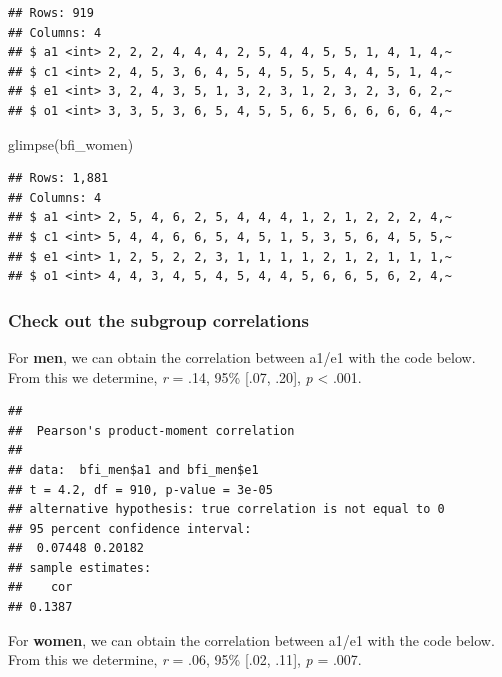 \documentclass[
]{krantz}
\makeatletter
\newenvironment{Shaded}{\begin{snugshade}}{\end{snugshade}}
\newcommand{\FunctionTok}[1]{\textcolor[rgb]{0,0,0}{#1}}
\newcommand{\NormalTok}[1]{#1}
\newcommand{\SpecialCharTok}[1]{\textcolor[rgb]{0,0,0}{#1}}
\newenvironment{kframe}{%
\medskip{}
\setlength{\fboxsep}{.8em}
 \def\at@end@of@kframe{}%
 \ifinner\ifhmode%
  \def\at@end@of@kframe{\end{minipage}}%
  \begin{minipage}{\columnwidth}%
 \fi\fi%
 \def\FrameCommand##1{\hskip\@totalleftmargin \hskip-\fboxsep
 \colorbox{shadecolor}{##1}\hskip-\fboxsep
     \hskip-\linewidth \hskip-\@totalleftmargin \hskip\columnwidth}%
 \MakeFramed {\advance\hsize-\width
   \@totalleftmargin\z@ \linewidth\hsize
   \@setminipage}}%
 {\par\unskip\endMakeFramed%
 \at@end@of@kframe}
\renewenvironment{Shaded}{\begin{kframe}}{\end{kframe}}
\makeatother
\begin{document}
\begin{verbatim}
## Rows: 919
## Columns: 4
## $ a1 <int> 2, 2, 2, 4, 4, 4, 2, 5, 4, 4, 5, 5, 1, 4, 1, 4,~
## $ c1 <int> 2, 4, 5, 3, 6, 4, 5, 4, 5, 5, 5, 4, 4, 5, 1, 4,~
## $ e1 <int> 3, 2, 4, 3, 5, 1, 3, 2, 3, 1, 2, 3, 2, 3, 6, 2,~
## $ o1 <int> 3, 3, 5, 3, 6, 5, 4, 5, 5, 6, 5, 6, 6, 6, 6, 4,~
\end{verbatim}

\begin{Shaded}
\begin{Highlighting}[]
\FunctionTok{glimpse}\NormalTok{(bfi\_women)}
\end{Highlighting}
\end{Shaded}

\begin{verbatim}
## Rows: 1,881
## Columns: 4
## $ a1 <int> 2, 5, 4, 6, 2, 5, 4, 4, 4, 1, 2, 1, 2, 2, 2, 4,~
## $ c1 <int> 5, 4, 4, 6, 6, 5, 4, 5, 1, 5, 3, 5, 6, 4, 5, 5,~
## $ e1 <int> 1, 2, 5, 2, 2, 3, 1, 1, 1, 1, 2, 1, 2, 1, 1, 1,~
## $ o1 <int> 4, 4, 3, 4, 5, 4, 5, 4, 4, 5, 6, 6, 5, 6, 2, 4,~
\end{verbatim}

\hypertarget{check-out-the-subgroup-correlations}{%
\subsubsection{Check out the subgroup correlations}\label{check-out-the-subgroup-correlations}}

For \textbf{men}, we can obtain the correlation between a1/e1 with the code below. From this we determine, \emph{r} = .14, 95\% {[}.07, .20{]}, \emph{p} \textless{} .001.

\begin{Shaded}
\end{Shaded}

\begin{verbatim}
## 
##  Pearson's product-moment correlation
## 
## data:  bfi_men$a1 and bfi_men$e1
## t = 4.2, df = 910, p-value = 3e-05
## alternative hypothesis: true correlation is not equal to 0
## 95 percent confidence interval:
##  0.07448 0.20182
## sample estimates:
##    cor 
## 0.1387
\end{verbatim}

For \textbf{women}, we can obtain the correlation between a1/e1 with the code below. From this we determine, \emph{r} = .06, 95\% {[}.02, .11{]}, \emph{p} = .007.
\end{document}
